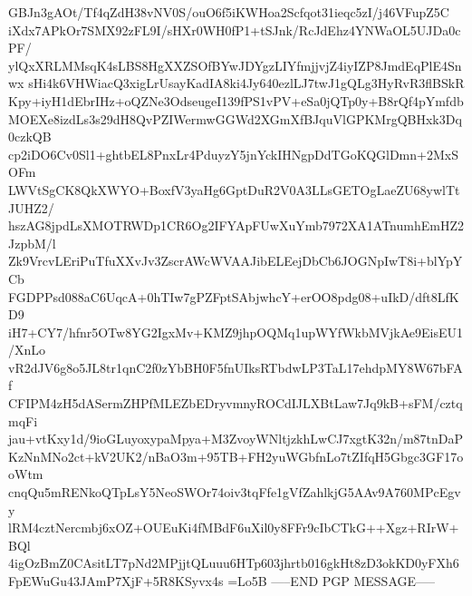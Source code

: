 GBJn3gAOt/Tf4qZdH38vNV0S/ouO6f5iKWHoa2Scfqot31ieqc5zI/j46VFupZ5C
iXdx7APkOr7SMX92zFL9I/sHXr0WH0fP1+tSJnk/RcJdEhz4YNWaOL5UJDa0cPF/
ylQxXRLMMsqK4sLBS8HgXXZSOfBYwJDYgzLIYfmjjvjZ4iyIZP8JmdEqPlE4Snwx
sHi4k6VHWiacQ3xigLrUsayKadIA8ki4Jy640ezlLJ7twJ1gQLg3HyRvR3flBSkR
Kpy+iyH1dEbrIHz+oQZNe3OdseugeI139fPS1vPV+eSa0jQTp0y+B8rQf4pYmfdb
MOEXe8izdLs3s29dH8QvPZIWermwGGWd2XGmXfBJquVlGPKMrgQBHxk3Dq0czkQB
cp2iDO6Cv0Sl1+ghtbEL8PnxLr4PduyzY5jnYckIHNgpDdTGoKQGlDmn+2MxSOFm
LWVtSgCK8QkXWYO+BoxfV3yaHg6GptDuR2V0A3LLsGETOgLaeZU68ywlTtJUHZ2/
hszAG8jpdLsXMOTRWDp1CR6Og2IFYApFUwXuYmb7972XA1ATnumhEmHZ2JzpbM/l
Zk9VrcvLEriPuTfuXXvJv3ZscrAWcWVAAJibELEejDbCb6JOGNpIwT8i+blYpYCb
FGDPPsd088aC6UqcA+0hTIw7gPZFptSAbjwhcY+erOO8pdg08+uIkD/dft8LfKD9
iH7+CY7/hfnr5OTw8YG2IgxMv+KMZ9jhpOQMq1upWYfWkbMVjkAe9EisEU1/XnLo
vR2dJV6g8o5JL8tr1qnC2f0zYbBH0F5fnUIksRTbdwLP3TaL17ehdpMY8W67bFAf
CFIPM4zH5dASermZHPfMLEZbEDryvmnyROCdIJLXBtLaw7Jq9kB+sFM/cztqmqFi
jau+vtKxy1d/9ioGLuyoxypaMpya+M3ZvoyWNltjzkhLwCJ7xgtK32n/m87tnDaP
KzNnMNo2ct+kV2UK2/nBaO3m+95TB+FH2yuWGbfnLo7tZIfqH5Gbgc3GF17ooWtm
cnqQu5mRENkoQTpLsY5NeoSWOr74oiv3tqFfe1gVfZahlkjG5AAv9A760MPcEgvy
lRM4cztNercmbj6xOZ+OUEuKi4fMBdF6uXil0y8FFr9cIbCTkG++Xgz+RIrW+BQl
4igOzBmZ0CAsitLT7pNd2MPjjtQLuuu6HTp603jhrtb016gkHt8zD3okKD0yFXh6
FpEWuGu43JAmP7XjF+5R8KSyvx4s
=Lo5B
-----END PGP MESSAGE-----
